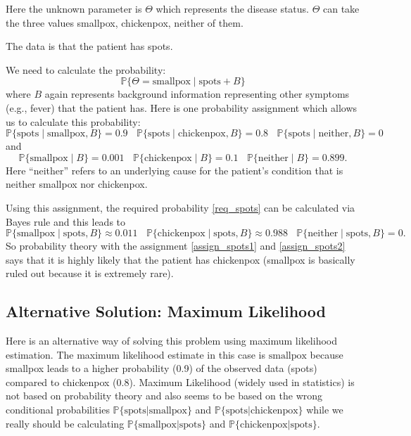 \documentclass{scrartcl}
\renewcommand{\P}{{\mathbb P}}
\begin{document}
Here the unknown parameter is $\Theta$ which represents the disease
status. $\Theta$ can take the three values smallpox, chickenpox,
neither of them.

The data is that the patient has spots.

We need to calculate the probability: 
\begin{equation}\label{req_spots}
  \P\{\Theta = \mathrm{smallpox} \mid \mathrm{spots} + B\}
\end{equation}
where $B$ again represents background information representing other
symptoms (e.g., fever) that the patient 
has. Here is one probability assignment which allows us to calculate 
this probability:   
\begin{equation}\label{assign_spots1}
 \P\{\mathrm{spots} \mid \mathrm{smallpox}, B\} = 0.9 ~~~~
 \P\{\mathrm{spots} \mid \mathrm{chickenpox}, B\} = 0.8 ~~~~
 \P\{\mathrm{spots} \mid \mathrm{neither}, B\} = 0
\end{equation}
and
\begin{equation}\label{assign_spots2}
 \P\{\mathrm{smallpox} \mid B\} = 0.001 ~~~~ \P\{\mathrm{chickenpox}
 \mid B\} = 0.1
~~~~ \P\{\mathrm{neither} \mid B\} = 0.899. 
\end{equation}
Here ``neither'' refers to an underlying cause for the patient's
condition that is neither smallpox nor chickenpox. 

Using this assignment, the required probability \eqref{req_spots} can
be calculated via Bayes rule and this leads to
\begin{equation*}
  \P\{\mathrm{smallpox} \mid \mathrm{spots}, B\} \approx 0.011 ~~~~
  \P\{\mathrm{chickenpox} \mid \mathrm{spots}, B\} \approx 0.988 ~~~~
  \P\{\mathrm{neither} \mid \mathrm{spots}, B\} = 0. 
\end{equation*}
So probability theory with the assignment \eqref{assign_spots1} and
\eqref{assign_spots2} says that it is highly likely that the patient
has chickenpox (smallpox is basically ruled out because it is
extremely rare).

\subsection{Alternative Solution: Maximum Likelihood} 
Here is an alternative way of solving this problem using maximum 
likelihood estimation. The maximum likelihood estimate in this case is
$\mathrm{smallpox}$ because smallpox leads to a higher probability 
(0.9) of the observed data (spots) compared to chickenpox
(0.8). Maximum Likelihood (widely used in statistics) is not based on
probability theory and also seems to be based on the wrong conditional
probabilities 
$\P\{\text{spots}|\text{smallpox}\}$ and
$\P\{\text{spots}|\text{chickenpox}\}$ while we really should be
calculating $\P\{\text{smallpox} | \text{spots}\}$ and
$\P\{\text{chickenpox} | \text{spots}\}$. \newline
\end{document}
